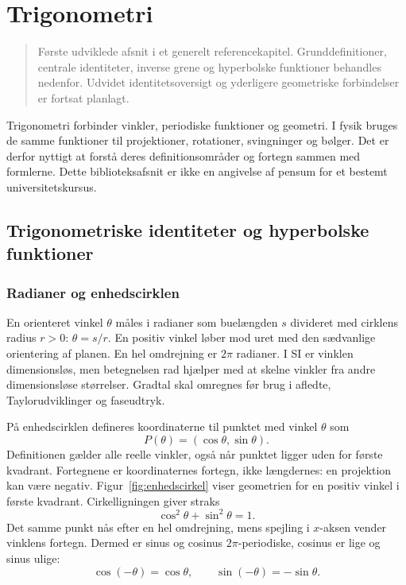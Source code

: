 \chapter{Trigonometri}
\label{ch:trigonometri}
\begin{quote}
\small\sffamily\color{arkivblaa}
Første udviklede afsnit i et generelt referencekapitel. Grunddefinitioner,
centrale identiteter, inverse grene og hyperbolske funktioner behandles nedenfor.
Udvidet identitetsoversigt og yderligere geometriske forbindelser er fortsat planlagt.
\end{quote}
Trigonometri forbinder vinkler, periodiske funktioner og geometri. I fysik
bruges de samme funktioner til projektioner, rotationer, svingninger og bølger.
Det er derfor nyttigt at forstå deres definitionsområder og fortegn sammen
med formlerne. Dette biblioteksafsnit er ikke en angivelse af pensum for et
bestemt universitetskursus.

\section{Trigonometriske identiteter og hyperbolske funktioner}
\label{sec:trigonometri}
\subsection{Radianer og enhedscirklen}
En orienteret vinkel $\theta$ måles i radianer som buelængden $s$ divideret
med cirklens radius $r>0$: $\theta=s/r$. En positiv vinkel løber mod uret
med den sædvanlige orientering af planen. En hel omdrejning er $2\pi$
radianer. I SI er vinklen dimensionsløs, men betegnelsen rad hjælper med
at skelne vinkler fra andre dimensionsløse størrelser. Gradtal skal omregnes
før brug i afledte, Taylorudviklinger og faseudtryk.

På enhedscirklen defineres koordinaterne til punktet med vinkel $\theta$ som
\[
 P(\theta)=(\cos\theta,\sin\theta).
\]
Definitionen gælder alle reelle vinkler, også når punktet ligger uden for
første kvadrant. Fortegnene er koordinaternes fortegn, ikke længdernes:
en projektion kan være negativ. Figur~\ref{fig:enhedscirkel} viser geometrien
for en positiv vinkel i første kvadrant. Cirkelligningen giver straks
\[
 \cos^2\theta+\sin^2\theta=1.
\]
Det samme punkt nås efter en hel omdrejning, mens spejling i $x$-aksen
vender vinklens fortegn. Dermed er sinus og cosinus $2\pi$-periodiske,
cosinus er lige og sinus ulige:
\[
 \cos(-\theta)=\cos\theta,\qquad
 \sin(-\theta)=-\sin\theta.
\]



